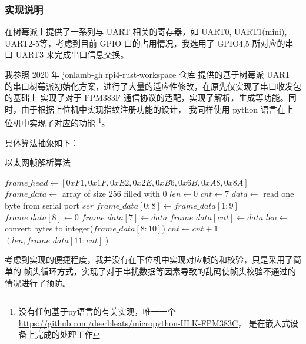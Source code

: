     \subsubsection{实现说明}

    在树莓派上提供了一系列与 UART 相关的寄存器，如 UART0, UART1(mini), 
    UART2-5等，考虑到目前 GPIO 口的占用情况，我选用了 GPIO4,5 所对应的串口
    UART3 来完成串口信息交换。

    我参照 2020 年 jonlamb-gh rpi4-rust-workspace 仓库\cite{rpi4-rust-workspace}
    提供的基于树莓派 UART 的串口树莓派初始化方案，进行了大量的适应性修改，在原先仅实现了串口收发包的基础上
    实现了对于 FPM383F 通信协议的适配，实现了解析，生成等功能。同时，由于根据上位机中实现指纹注册功能的设计，
    我同样使用 python 语言在上位机中实现了对应的功能
    \footnote{没有任何基于py语言的有关实现，唯一一个\href{micropython-HLK-FPM383C}{https://github.com/deerbleats/micropython-HLK-FPM383C}， 是在嵌入式设备上完成的处理工作}。

    具体算法抽象如下：

    \begin{algorithm}[H]
    \caption{以太网帧解析算法}
    \label{algorithm::UART}
    \begin{algorithmic}[1]
        \State $frame\_head \gets [0xF1, 0x1F, 0xE2, 0x2E, 0xB6, 0x6B, 0xA8, 0x8A]$ 
        \State $frame\_data \gets$ array of size 256 filled with 0 
        \State $len \gets 0$
        \State $cnt \gets 7$ 
            \State $data \gets$ read one byte from serial port $ser$ 
                \State $frame\_data[0:8] \gets frame\_data[1:9]$
                \State $frame\_data[8] \gets 0$ 
                \State $frame\_data[7] \gets data$
            \EndIf
                \State $frame\_data[cnt] \gets data$
                    \State $len \gets$ convert bytes to integer($frame\_data[8:10]$)
                \EndIf
                \State $cnt \gets cnt + 1$
            \EndIf
             
                \State \Return $(len, frame\_data[11:cnt])$ 
            \EndIf
        \EndWhile
    \EndFunction
    \end{algorithmic}
    \end{algorithm}
    
    考虑到实现的便捷程度，我并没有在下位机中实现对应帧的和校验，只是采用了简单的
    帧头循环方式，实现了对于串扰数据等因素导致的乱码使帧头校验不通过的情况进行了预防。
